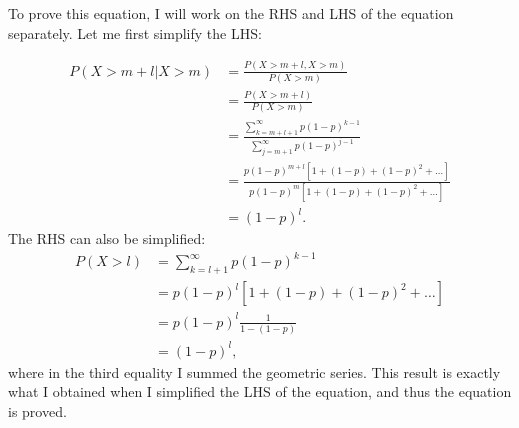 \begin{problem}{9} To prove this equation, I will work on the RHS and LHS of the equation separately.  Let me first simplify the LHS:

\begin{align*}
P(X>m+l|X>m)& =\frac{P(X>m+l, X>m)}{P(X>m)}\\
&=\frac{P(X>m+l)}{P(X>m)}\\
&=\frac{\sum_{k=m+l+1}^\infty p(1-p)^{k-1}}{\sum_{j=m+1}^\infty p(1-p)^{j-1}} \\
&=\frac{p(1-p)^{m+l}[1+(1-p)+(1-p)^2 +\ldots]}{p(1-p)^{m}[1+(1-p)+(1-p)^2 +\ldots]}\\
& = (1-p)^l.
\end{align*}
The RHS can also be simplified:
\begin{align*}
P(X>l) &= \sum_{k=l+1}^{\infty}p(1-p)^{k-1}\\
&= p(1-p)^l[1+(1-p)+(1-p)^2+\ldots] \\
&=p(1-p)^l\frac{1}{1-(1-p)}\\
&=(1-p)^l,
\end{align*}
where in the third equality I summed the geometric series.  This result is exactly what I obtained when I simplified the LHS of the equation, and thus the equation is proved.


\end{problem}


